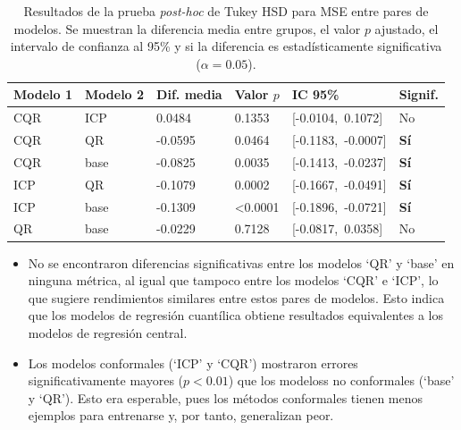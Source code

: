 \renewcommand{\arraystretch}{1.2}
\begin{table}[h]
    \small
    \centering
    \begin{tabular}{llllll}
    \toprule
    \textbf{Modelo 1} & \textbf{Modelo 2} & \textbf{Dif. media} & \textbf{Valor $p$} & \textbf{IC 95\%} & \textbf{Signif.} \\
    \midrule
    CQR  & ICP   & 0.0484  & 0.1353   & [-0.0104,\ 0.1072]     & No            \\
    CQR  & QR    & -0.0595 & 0.0464   & [-0.1183,\ -0.0007]    & \textbf{Sí}   \\
    CQR  & base  & -0.0825 & 0.0035   & [-0.1413,\ -0.0237]    & \textbf{Sí}   \\
    ICP  & QR    & -0.1079 & 0.0002   & [-0.1667,\ -0.0491]    & \textbf{Sí}   \\
    ICP  & base  & -0.1309 & \textless 0.0001  & [-0.1896,\ -0.0721]    & \textbf{Sí}   \\
    QR   & base  & -0.0229 & 0.7128   & [-0.0817,\ 0.0358]     & No            \\
    \bottomrule
    \end{tabular}
    \caption[
        Resultados de la prueba \textit{post-hoc} de Tukey HSD para MSE entre pares de modelos.
    ]{
        Resultados de la prueba \textit{post-hoc} de Tukey HSD para MSE entre pares de modelos. Se muestran la 
        diferencia media entre grupos, el valor $p$ ajustado, el intervalo de confianza al 95\% y si la 
        diferencia es estadísticamente significativa ($\alpha = 0.05$).
    }
    \label{tab:AE_tukey_mse}
\end{table}

\begin{itemize}
    
    \item No se encontraron diferencias significativas entre los modelos `QR' y `base' en ninguna métrica, al
    igual que tampoco entre los modelos `CQR' e `ICP', lo que sugiere rendimientos similares entre estos pares
    de modelos. Esto indica que los modelos de regresión cuantílica obtiene resultados equivalentes a los 
    modelos de regresión central.  

    \item Los modelos conformales (`ICP' y `CQR') mostraron errores significativamente mayores ($p<0.01$) 
    que los modeloss no conformales (`base' y `QR'). Esto era esperable, pues los métodos conformales tienen 
    menos ejemplos para entrenarse y, por tanto, generalizan peor. 

\end{itemize}


